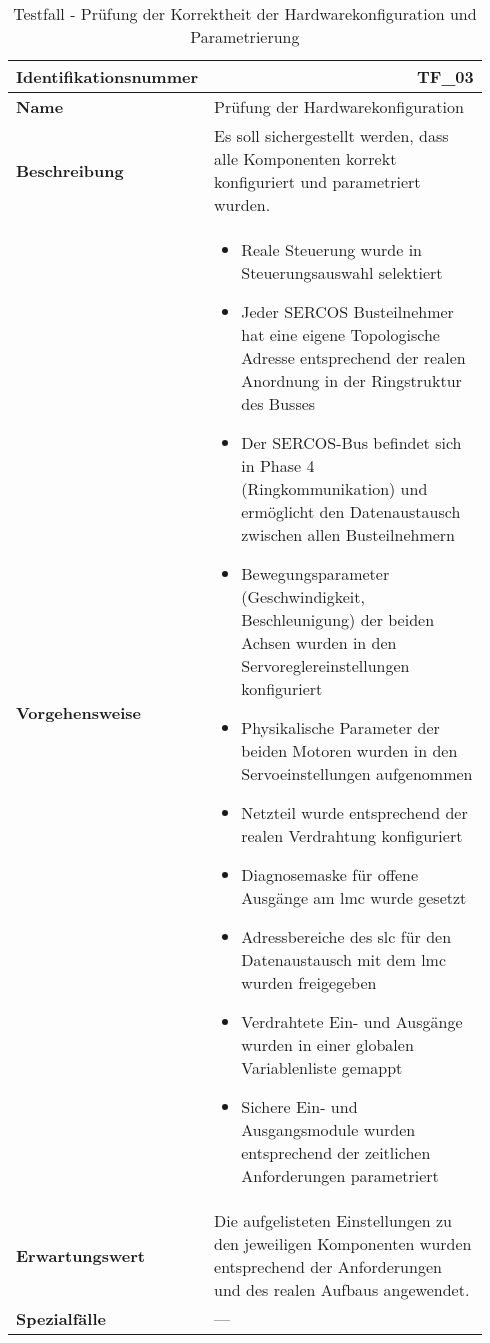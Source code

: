 \documentclass[../../../Bachelorarbeit.tex]{subfiles}
\begin{document}
\begin{table}[H]
    \centering
    \begin{tabular}{ p{0.34\linewidth}  p{0.6\linewidth} }
        \hline
        \textbf{Identifikationsnummer}  & \multicolumn{1}{r}{TF\_03} \\ \hline
        \textbf{Name}                   & Prüfung der Hardwarekonfiguration \\
        \textbf{Beschreibung}           & Es soll sichergestellt werden, dass alle Komponenten korrekt konfiguriert und parametriert wurden. \\
        \textbf{Vorgehensweise}         &   {\begin{itemize}[noitemsep,topsep=0pt,parsep=0pt,partopsep=0pt,leftmargin=*]
                                                \item Reale Steuerung wurde in Steuerungsauswahl selektiert
                                                \item Jeder SERCOS Busteilnehmer hat eine eigene Topologische Adresse entsprechend der realen Anordnung in der Ringstruktur des Busses
                                                \item Der SERCOS-Bus befindet sich in Phase 4 (Ringkommunikation) und ermöglicht den Datenaustausch zwischen allen Busteilnehmern
                                                \item Bewegungsparameter (Geschwindigkeit, Beschleunigung) der beiden Achsen wurden in den Servoreglereinstellungen konfiguriert
                                                \item Physikalische Parameter der beiden Motoren wurden in den Servoeinstellungen aufgenommen
                                                \item Netzteil wurde entsprechend der realen Verdrahtung konfiguriert
                                                \item Diagnosemaske für offene Ausgänge am \acs{lmc} wurde gesetzt
                                                \item Adressbereiche des \acs{slc} für den Datenaustausch mit dem \acs{lmc} wurden freigegeben
                                                \item Verdrahtete Ein- und Ausgänge wurden in einer globalen Variablenliste gemappt
                                                \item Sichere Ein- und Ausgangsmodule wurden entsprechend der zeitlichen Anforderungen parametriert
                                            \end{itemize}} \\
        \textbf{Erwartungswert}         & Die aufgelisteten Einstellungen zu den jeweiligen Komponenten wurden entsprechend der Anforderungen und des realen Aufbaus angewendet. \\
        \textbf{Spezialfälle}           & --- \\ \hline
    \end{tabular}
    \caption[\acs{tf} - Hardwarekonfigurationsprüfung]{Testfall - Prüfung der Korrektheit der Hardwarekonfiguration und Parametrierung}
    \label{tab:my-table62}
\end{table}
\end{document}
